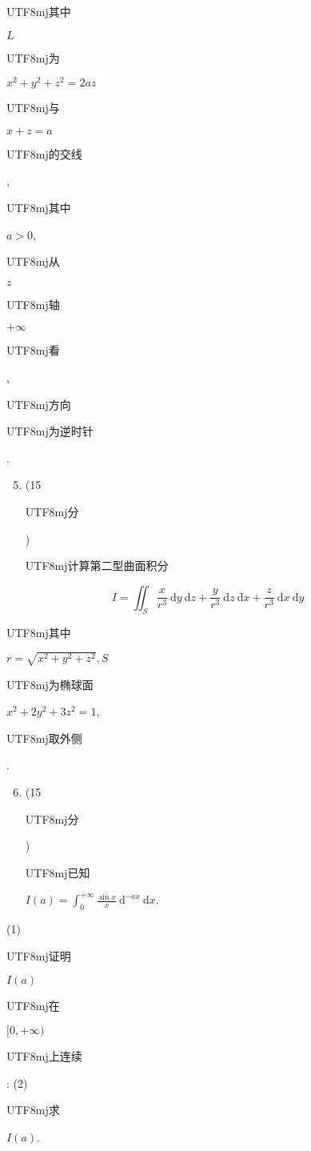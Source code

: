 \documentclass[10pt]{article}
\begin{document}
\begin{CJK}{UTF8}{mj}其中\end{CJK} $L$ \begin{CJK}{UTF8}{mj}为\end{CJK} $x^{2}+y^{2}+z^{2}=2 a z$ \begin{CJK}{UTF8}{mj}与\end{CJK} $x+z=a$ \begin{CJK}{UTF8}{mj}的交线\end{CJK}, \begin{CJK}{UTF8}{mj}其中\end{CJK} $a>0$, \begin{CJK}{UTF8}{mj}从\end{CJK} $z$ \begin{CJK}{UTF8}{mj}轴\end{CJK} $+\infty$ \begin{CJK}{UTF8}{mj}看\end{CJK}, \begin{CJK}{UTF8}{mj}方向\end{CJK} \begin{CJK}{UTF8}{mj}为逆时针\end{CJK}.

\begin{enumerate}
  \setcounter{enumi}{4}
  \item (15 \begin{CJK}{UTF8}{mj}分\end{CJK}) \begin{CJK}{UTF8}{mj}计算第二型曲面积分\end{CJK}
\end{enumerate}
$$
I=\iint_{S} \frac{x}{r^{3}} \mathrm{~d} y \mathrm{~d} z+\frac{y}{r^{3}} \mathrm{~d} z \mathrm{~d} x+\frac{z}{r^{3}} \mathrm{~d} x \mathrm{~d} y
$$
\begin{CJK}{UTF8}{mj}其中\end{CJK} $r=\sqrt{x^{2}+y^{2}+z^{2}}, S$ \begin{CJK}{UTF8}{mj}为椭球面\end{CJK} $x^{2}+2 y^{2}+3 z^{2}=1$, \begin{CJK}{UTF8}{mj}取外侧\end{CJK}.

\begin{enumerate}
  \setcounter{enumi}{5}
  \item (15 \begin{CJK}{UTF8}{mj}分\end{CJK}) \begin{CJK}{UTF8}{mj}已知\end{CJK} $I(a)=\int_{0}^{+\infty} \frac{\sin x}{x} \mathrm{~d}^{-a x} \mathrm{~d} x$.
\end{enumerate}
(1) \begin{CJK}{UTF8}{mj}证明\end{CJK} $I(a)$ \begin{CJK}{UTF8}{mj}在\end{CJK} $[0,+\infty)$ \begin{CJK}{UTF8}{mj}上连续\end{CJK}: (2) \begin{CJK}{UTF8}{mj}求\end{CJK} $I(a)$.
\end{document}
